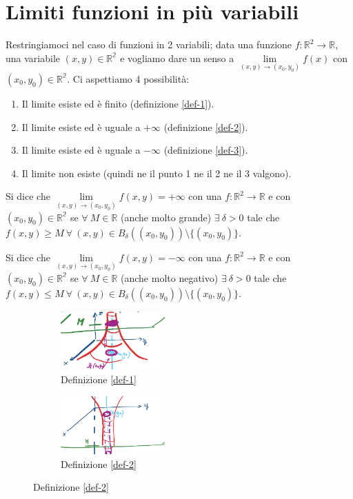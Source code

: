 \newpage
\section{Limiti funzioni in più variabili}
Restringiamoci nel caso di funzioni in 2 variabili; data una funzione $f: \mathbb{R}^2 \to \mathbb{R}$, una variabile $(x,y) \in \mathbb{R^2}$ e vogliamo dare un senso a $\lim\limits_{(x,y) \to (x_0, y_0)}f(x)$ con $(x_0, y_0) \in \mathbb{R^2}$. Ci aspettiamo 4 possibilità:
\begin{enumerate}
    \item Il limite esiste ed è finito (definizione \ref{def-1}).
    \item Il limite esiste ed è uguale a $+\infty$ (definizione \ref{def-2}).
    \item Il limite esiste ed è uguale a $-\infty$ (definizione \ref{def-3}).
    \item Il limite non esiste (quindi ne il punto 1 ne il 2 ne il 3 valgono).
\end{enumerate}

\begin{definition}\label{def-1}
Si dice che $\lim\limits_{(x,y) \to (x_0, y_0)} f(x,y) = +\infty$ con una $f: \mathbb{R}^2 \to \mathbb{R}$ e con $(x_0, y_0) \in \mathbb{R^2}$ se $\forall \: M \in \mathbb{R}$ (anche molto grande) $\exists \: \delta > 0$ tale che $f(x,y) \geq M \:\forall \: (x,y) \in B_{\delta}((x_0, y_0)) \setminus \{(x_0, y_0)\}$.
\end{definition}

\begin{definition}\label{def-2}
Si dice che $\lim\limits_{(x,y) \to (x_0, y_0)} f(x,y) = -\infty$ con una $f: \mathbb{R}^2 \to \mathbb{R}$ e con $(x_0, y_0) \in \mathbb{R^2}$ se $\forall \: M \in \mathbb{R}$ (anche molto negativo) $\exists \: \delta > 0$ tale che $f(x,y) \leq M \:\forall \: (x,y) \in B_{\delta}((x_0, y_0)) \setminus \{(x_0, y_0)\}$.
\end{definition}

\begin{figure}[h!]
\centering
\begin{subfigure}{.45\textwidth}
    \centering
    \includegraphics[width=4cm]{images/limiti-piu-variabili-+inf.png}
    \caption{Definizione \ref{def-1}}
\end{subfigure}
\begin{subfigure}{.45\textwidth}
    \centering
    \includegraphics[width=4cm]{images/limiti-piu-variabili--inf.png}
    \caption{Definizione \ref{def-2}}
\end{subfigure}
\end{figure}

